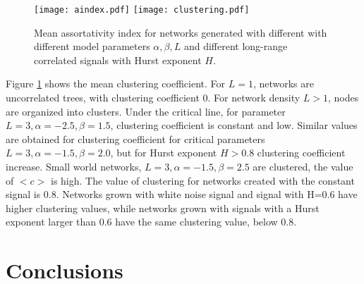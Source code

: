 \begin{figure}[h]
	\centering
	\texttt{[image: aindex.pdf]}
	\texttt{[image: clustering.pdf]}
	\caption{Mean assortativity index for networks generated with different with different model parameters $\alpha, \beta, L$ and different long-range correlated signals with Hurst exponent $H$.}
	\label{fig:aindex}
\end{figure} 

Figure \ref{fig:aindex} shows the mean clustering coefficient. For $L=1$, networks are uncorrelated trees, with clustering coefficient $0$. For network density $L>1$, nodes are organized into clusters. Under the critical line, for parameter  $L=3, \alpha=-2.5, \beta=1.5 $, clustering coefficient is constant and low. Similar values are obtained for clustering coefficient for critical parameters $L=3, \alpha=-1.5, \beta=2.0$, but for Hurst exponent $H>0.8$ clustering coefficient increase. Small world networks,  $L=3, \alpha=-1.5, \beta=2.5$ are clustered, the value of $<c>$ is high.  The value of clustering for networks created with the constant signal is 0.8. Networks grown with white noise signal and signal with H=0.6 have higher clustering values, while networks grown with signals with a Hurst exponent larger than 0.6 have the same clustering value, below 0.8. 

\section{Conclusions}



